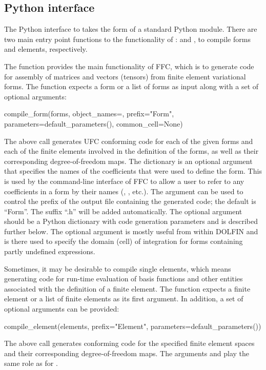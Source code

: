 \subsection{Python interface}

The Python interface to \ffc{} takes the form of a standard
Python module. There are two main entry point functions to the
functionality of \ffc{}:  and
, to compile forms and elements, respectively.

The  function provides the main functionality of
FFC, which is to generate code for assembly of matrices and vectors
(tensors) from finite element variational
forms. The  function expects a form or a list of
forms as input along with a set of optional arguments:
%
\begin{python}
compile_form(forms,
             object_names={},
             prefix="Form",
             parameters=default_parameters(),
             common_cell=None)
\end{python}
%
The above call generates UFC conforming code for each of the given
forms and each of the finite elements involved in the definition of
the forms, as well as their corresponding degree-of-freedom
maps. The  dictionary is an optional argument that
specifies the names of the coefficients that were used to define the
form. This is used by the command-line interface of FFC to allow a
user to refer to any coefficients in a form by their names
(, , etc.). The  argument can be used to
control the prefix of the output file containing the generated code;
the default is ``Form''. The suffix ``.h'' will be added
automatically. The optional argument  should be a
Python dictionary with code generation parameters and is described
further below.  The optional argument  is mostly
useful from within DOLFIN and is there used to specify the domain
(cell) of integration for forms containing partly undefined
expressions.

Sometimes, it may be desirable to compile single elements, which means
generating code for run-time evaluation of basis functions and other
entities associated with the definition of a finite element.
The  function expects a finite element or a list
of finite elements as its first argument. In addition, a set of
optional arguments can be provided:
%
\begin{python}
compile_element(elements,
                prefix="Element",
                parameters=default_parameters())
\end{python}
%
The above call generates \ufc{} conforming code for the specified
finite element spaces and their corresponding degree-of-freedom maps.
The arguments  and
 play the same role as for
.

